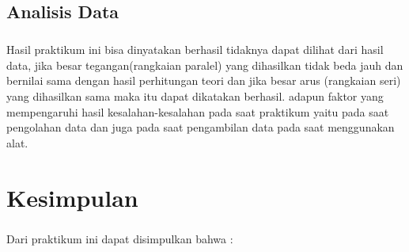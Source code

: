 \documentclass[12pt,a4paper]{article}
\begin{document}
\subsection{Analisis Data}
\subparagraph{}
	Hasil praktikum ini bisa dinyatakan berhasil tidaknya dapat dilihat dari hasil data, jika besar tegangan(rangkaian paralel) yang dihasilkan tidak beda jauh dan bernilai sama dengan hasil perhitungan teori dan jika besar arus (rangkaian seri) yang dihasilkan sama maka itu dapat dikatakan berhasil. adapun faktor yang mempengaruhi hasil kesalahan-kesalahan pada saat praktikum yaitu pada saat pengolahan data dan juga pada saat pengambilan data pada saat menggunakan alat.
 

\newpage
\section{Kesimpulan}
\subparagraph{ }
Dari praktikum ini dapat disimpulkan bahwa :
\end{document}
